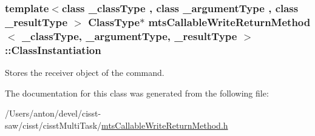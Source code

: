 \subsubsection[{Class\+Instantiation}]{\setlength{\rightskip}{0pt plus 5cm}template$<$class \+\_\+class\+Type , class \+\_\+argument\+Type , class \+\_\+result\+Type $>$ {\bf Class\+Type}$\ast$ {\bf mts\+Callable\+Write\+Return\+Method}$<$ \+\_\+class\+Type, \+\_\+argument\+Type, \+\_\+result\+Type $>$\+::Class\+Instantiation\hspace{0.3cm}{\ttfamily [protected]}}\label{classmts_callable_write_return_method_abf8e145001a1e02c63a7cc66ee87f066}
Stores the receiver object of the command. 

The documentation for this class was generated from the following file\+:\begin{DoxyCompactItemize}
\item 
/\+Users/anton/devel/cisst-\/saw/cisst/cisst\+Multi\+Task/\hyperlink{mts_callable_write_return_method_8h}{mts\+Callable\+Write\+Return\+Method.\+h}\end{DoxyCompactItemize}
